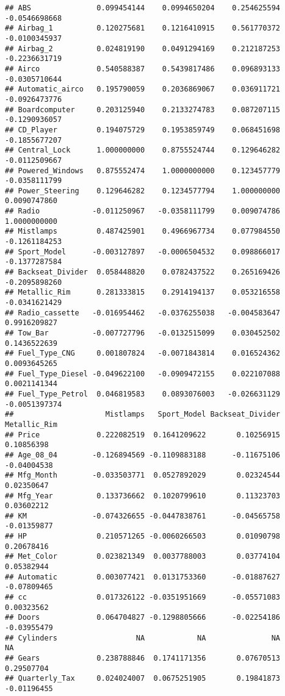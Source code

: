 \documentclass[]{article}
\begin{document}
\begin{verbatim}
## ABS               0.099454144    0.0994650204    0.254625594 -0.0546698668
## Airbag_1          0.120275681    0.1216410915    0.561770372 -0.0100345937
## Airbag_2          0.024819190    0.0491294169    0.212187253 -0.2236631719
## Airco             0.540588387    0.5439817486    0.096893133 -0.0305710644
## Automatic_airco   0.195790059    0.2036869067    0.036911721 -0.0926473776
## Boardcomputer     0.203125940    0.2133274783    0.087207115 -0.1290936057
## CD_Player         0.194075729    0.1953859749    0.068451698 -0.1855677207
## Central_Lock      1.000000000    0.8755524744    0.129646282 -0.0112509667
## Powered_Windows   0.875552474    1.0000000000    0.123457779 -0.0358111799
## Power_Steering    0.129646282    0.1234577794    1.000000000  0.0090747860
## Radio            -0.011250967   -0.0358111799    0.009074786  1.0000000000
## Mistlamps         0.487425901    0.4966967734    0.077984550 -0.1261184253
## Sport_Model      -0.003127897   -0.0006504532    0.098866017 -0.1377287584
## Backseat_Divider  0.058448820    0.0782437522    0.265169426 -0.2095898260
## Metallic_Rim      0.281333815    0.2914194137    0.053216558 -0.0341621429
## Radio_cassette   -0.016954462   -0.0376255038   -0.004583647  0.9916209827
## Tow_Bar          -0.007727796   -0.0132515099    0.030452502  0.1436522639
## Fuel_Type_CNG     0.001807824   -0.0071843814    0.016524362  0.0093645265
## Fuel_Type_Diesel -0.049622100   -0.0909472155    0.022107088  0.0021141344
## Fuel_Type_Petrol  0.046819583    0.0893076003   -0.026631129 -0.0051397374
##                     Mistlamps   Sport_Model Backseat_Divider Metallic_Rim
## Price             0.222082519  0.1641209622       0.10256915   0.10856398
## Age_08_04        -0.126894569 -0.1109883188      -0.11675106  -0.04004538
## Mfg_Month        -0.033503771  0.0527892029       0.02324544   0.02350647
## Mfg_Year          0.133736662  0.1020799610       0.11323703   0.03602212
## KM               -0.074326655 -0.0447838761      -0.04565758  -0.01359877
## HP                0.210571265 -0.0060266503       0.01090798   0.20678416
## Met_Color         0.023821349  0.0037788003       0.03774104   0.05382944
## Automatic         0.003077421  0.0131753360      -0.01887627  -0.07809465
## cc                0.017326122 -0.0351951669      -0.05571083   0.00323562
## Doors             0.064704827 -0.1298805666      -0.02254186  -0.03955479
## Cylinders                  NA            NA               NA           NA
## Gears             0.238788846  0.1741171356       0.07670513   0.29507704
## Quarterly_Tax     0.024024007  0.0675251905       0.19841873  -0.01196455

\end{verbatim}
\end{document}
